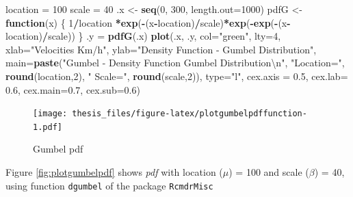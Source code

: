 \documentclass[12pt,twoside]{reedthesis}
\newenvironment{Shaded}{\begin{snugshade}}{\end{snugshade}}
\newcommand{\CharTok}[1]{\textcolor[rgb]{0.31,0.60,0.02}{#1}}
\newcommand{\ControlFlowTok}[1]{\textcolor[rgb]{0.13,0.29,0.53}{\textbf{#1}}}
\newcommand{\DataTypeTok}[1]{\textcolor[rgb]{0.13,0.29,0.53}{#1}}
\newcommand{\DecValTok}[1]{\textcolor[rgb]{0.00,0.00,0.81}{#1}}
\newcommand{\FloatTok}[1]{\textcolor[rgb]{0.00,0.00,0.81}{#1}}
\newcommand{\KeywordTok}[1]{\textcolor[rgb]{0.13,0.29,0.53}{\textbf{#1}}}
\newcommand{\NormalTok}[1]{#1}
\newcommand{\OperatorTok}[1]{\textcolor[rgb]{0.81,0.36,0.00}{\textbf{#1}}}
\newcommand{\StringTok}[1]{\textcolor[rgb]{0.31,0.60,0.02}{#1}}
\begin{document}
\footnotesize
\begin{Shaded}
\begin{Highlighting}[]
\NormalTok{location =}\StringTok{ }\DecValTok{100}
\NormalTok{scale =}\StringTok{ }\DecValTok{40}
\NormalTok{.x <-}\StringTok{ }\KeywordTok{seq}\NormalTok{(}\DecValTok{0}\NormalTok{, }\DecValTok{300}\NormalTok{, }\DataTypeTok{length.out=}\DecValTok{1000}\NormalTok{)}
\NormalTok{pdfG <-}\StringTok{ }\ControlFlowTok{function}\NormalTok{(x) \{}
  \DecValTok{1}\OperatorTok{/}\NormalTok{location }\OperatorTok{*}\KeywordTok{exp}\NormalTok{(}\OperatorTok{-}\NormalTok{(x}\OperatorTok{-}\NormalTok{location)}\OperatorTok{/}\NormalTok{scale)}\OperatorTok{*}\KeywordTok{exp}\NormalTok{(}\OperatorTok{-}\KeywordTok{exp}\NormalTok{(}\OperatorTok{-}\NormalTok{(x}\OperatorTok{-}\NormalTok{location)}\OperatorTok{/}\NormalTok{scale))}
\NormalTok{  \}}
\NormalTok{.y =}\StringTok{ }\KeywordTok{pdfG}\NormalTok{(.x)}
\KeywordTok{plot}\NormalTok{(.x, .y, }\DataTypeTok{col=}\StringTok{"green"}\NormalTok{, }\DataTypeTok{lty=}\DecValTok{4}\NormalTok{, }
     \DataTypeTok{xlab=}\StringTok{"Velocities Km/h"}\NormalTok{, }\DataTypeTok{ylab=}\StringTok{"Density Function - Gumbel Distribution"}\NormalTok{, }
     \DataTypeTok{main=}\KeywordTok{paste}\NormalTok{(}\StringTok{"Gumbel - Density Function Gumbel Distribution}\CharTok{\textbackslash{}n}\StringTok{"}\NormalTok{, }\StringTok{"Location="}\NormalTok{, }
     \KeywordTok{round}\NormalTok{(location,}\DecValTok{2}\NormalTok{), }\StringTok{" Scale="}\NormalTok{, }\KeywordTok{round}\NormalTok{(scale,}\DecValTok{2}\NormalTok{)), }\DataTypeTok{type=}\StringTok{"l"}\NormalTok{, }
     \DataTypeTok{cex.axis =} \FloatTok{0.5}\NormalTok{, }\DataTypeTok{cex.lab=} \FloatTok{0.6}\NormalTok{, }\DataTypeTok{cex.main=}\FloatTok{0.7}\NormalTok{, }\DataTypeTok{cex.sub=}\FloatTok{0.6}\NormalTok{)}
\end{Highlighting}
\end{Shaded}
\begin{figure}
\centering
\texttt{[image: thesis\_files/figure-latex/plotgumbelpdffunction-1.pdf]}
\caption{\label{fig:plotgumbelpdffunction}Gumbel pdf}
\end{figure}
\normalsize

Figure \ref{fig:plotgumbelpdf} shows \emph{pdf} with location (\(\mu\)) = 100 and scale (\(\beta\)) = 40, using function \texttt{dgumbel} of the package \texttt{RcmdrMisc}
\end{document}
